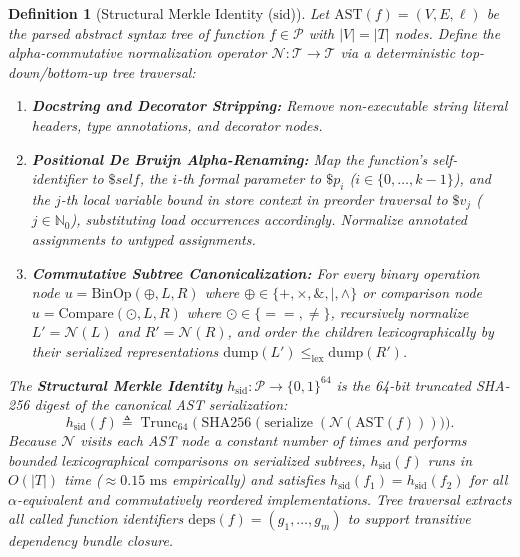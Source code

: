 \documentclass[10pt,twocolumn]{article}
\newtheorem{definition}{Definition}
\begin{document}
\begin{definition}[Structural Merkle Identity ($\text{sid}$)]
\label{def:sid}
Let $\text{AST}(f) = (V, E, \ell)$ be the parsed abstract syntax tree of function $f \in \mathcal{P}$ with $|V| = |T|$ nodes. Define the alpha-commutative normalization operator $\mathcal{N}: \mathcal{T} \to \mathcal{T}$ via a deterministic top-down/bottom-up tree traversal:
\begin{enumerate}
    \item \textbf{Docstring and Decorator Stripping:} Remove non-executable string literal headers, type annotations, and decorator nodes.
    \item \textbf{Positional De Bruijn Alpha-Renaming:} Map the function's self-identifier to $\$self$, the $i$-th formal parameter to $\$p_i$ ($i \in \{0, \dots, k-1\}$), and the $j$-th local variable bound in store context in preorder traversal to $\$v_j$ ($j \in \mathbb{N}_0$), substituting load occurrences accordingly. Normalize annotated assignments to untyped assignments.
    \item \textbf{Commutative Subtree Canonicalization:} For every binary operation node $u = \text{BinOp}(\oplus, L, R)$ where $\oplus \in \{+, \times, \mathbin{\&}, \mathbin{|}, \mathbin{\wedge}\}$ or comparison node $u = \text{Compare}(\odot, L, R)$ where $\odot \in \{==, \neq\}$, recursively normalize $L' = \mathcal{N}(L)$ and $R' = \mathcal{N}(R)$, and order the children lexicographically by their serialized representations $\text{dump}(L') \le_{\text{lex}} \text{dump}(R')$.
\end{enumerate}
The \textbf{Structural Merkle Identity} $h_{\text{sid}}: \mathcal{P} \to \{0,1\}^{64}$ is the 64-bit truncated SHA-256 digest of the canonical AST serialization:
\begin{equation}
    h_{\text{sid}}(f) \triangleq \operatorname{Trunc}_{64}\!\Big(\operatorname{SHA256}\big(\operatorname{serialize}(\mathcal{N}(\text{AST}(f)))\big)\Big).
\end{equation}
Because $\mathcal{N}$ visits each AST node a constant number of times and performs bounded lexicographical comparisons on serialized subtrees, $h_{\text{sid}}(f)$ runs in $O(|T|)$ time ($\approx 0.15\text{ ms}$ empirically) and satisfies $h_{\text{sid}}(f_1) = h_{\text{sid}}(f_2)$ for all $\alpha$-equivalent and commutatively reordered implementations. Tree traversal extracts all called function identifiers $\text{deps}(f) = (g_1, \dots, g_m)$ to support transitive dependency bundle closure.
\end{definition}
\end{document}
